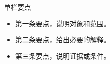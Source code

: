 \begin{frame}{单栏要点}
  \begin{itemize}
    \item 第一条要点，说明对象和范围。
    \item 第二条要点，给出必要的解释。
    \item 第三条要点，说明证据或条件。
  \end{itemize}
\end{frame}

